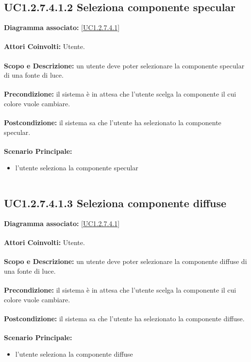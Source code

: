 \subsection{UC1.2.7.4.1.2 Seleziona componente specular}
\textbf{Diagramma associato:}
\ref{UC1.2.7.4.1} \\ \\
\textbf{Attori Coinvolti:}
Utente. \\ \\
\textbf{Scopo e Descrizione:}
un utente deve poter selezionare la componente specular di una fonte di luce. \\ \\
\textbf{Precondizione:}
il sistema è in attesa che l'utente scelga la componente il cui colore vuole cambiare. \\ \\
\textbf{Postcondizione:}
il sistema sa che l'utente ha selezionato la componente specular. \\ \\
\textbf{Scenario Principale:}
\begin{itemize}
\item l'utente seleziona la componente specular
\\ \\ \end{itemize}


\subsection{UC1.2.7.4.1.3 Seleziona componente diffuse}
\textbf{Diagramma associato:}
\ref{UC1.2.7.4.1} \\ \\
\textbf{Attori Coinvolti:}
Utente. \\ \\
\textbf{Scopo e Descrizione:}
un utente deve poter selezionare la componente diffuse di una fonte di luce. \\ \\
\textbf{Precondizione:}
il sistema è in attesa che l'utente scelga la componente il cui colore vuole cambiare. \\ \\
\textbf{Postcondizione:}
il sistema sa che l'utente ha selezionato la componente diffuse. \\ \\
\textbf{Scenario Principale:}
\begin{itemize}
\item l'utente seleziona la componente diffuse
\\ \\ \end{itemize}


